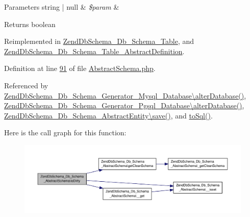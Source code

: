 \begin{DoxyParams}[1]{Parameters}
string | null & {\em \$param} & \\
\hline
\end{DoxyParams}
\begin{DoxyReturn}{Returns}
boolean 
\end{DoxyReturn}


Reimplemented in \hyperlink{classZendDbSchema__Db__Schema__Table_a21a2a75870207a989576655fec7507c3}{Zend\-Db\-Schema\-\_\-\-Db\-\_\-\-Schema\-\_\-\-Table}, and \hyperlink{classZendDbSchema__Db__Schema__Table__AbstractDefinition_a92b77fa23ce49db1c39edcc583ec6cfe}{Zend\-Db\-Schema\-\_\-\-Db\-\_\-\-Schema\-\_\-\-Table\-\_\-\-Abstract\-Definition}.



Definition at line \hyperlink{AbstractSchema_8php_source_l00091}{91} of file \hyperlink{AbstractSchema_8php_source}{Abstract\-Schema.\-php}.



Referenced by \hyperlink{Generator_2Mysql_2Database_8php_source_l00064}{Zend\-Db\-Schema\-\_\-\-Db\-\_\-\-Schema\-\_\-\-Generator\-\_\-\-Mysql\-\_\-\-Database\textbackslash{}alter\-Database()}, \hyperlink{Generator_2Pgsql_2Database_8php_source_l00075}{Zend\-Db\-Schema\-\_\-\-Db\-\_\-\-Schema\-\_\-\-Generator\-\_\-\-Pgsql\-\_\-\-Database\textbackslash{}alter\-Database()}, \hyperlink{AbstractEntity_8php_source_l00169}{Zend\-Db\-Schema\-\_\-\-Db\-\_\-\-Schema\-\_\-\-Abstract\-Entity\textbackslash{}save()}, and \hyperlink{AbstractSchema_8php_source_l00341}{to\-Sql()}.



Here is the call graph for this function\-:\nopagebreak
\begin{figure}[H]
\begin{center}
\leavevmode
\includegraphics[width=350pt]{classZendDbSchema__Db__Schema__AbstractSchema_ae859790a91bbcb9c4dc52a6139e5999e_cgraph}
\end{center}
\end{figure}




